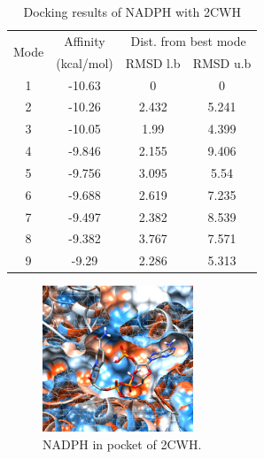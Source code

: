 \documentclass[12pt]{article}
\begin{document}
		
	\begin{table}[h!]
		\centering
		\caption{\centering Docking results of NADPH with 2CWH}
		\label{table10_1}
		\begin{tabular}{cccc}
			\toprule
			\multirow{2}{*}{Mode} & Affinity & \multicolumn{2}{c}{Dist. from best mode}\\
			&  (kcal/mol) & RMSD l.b & RMSD u.b\\
			\midrule
			1 & -10.63 & 0     & 0     \\
			2 & -10.26 & 2.432 & 5.241 \\
			3 & -10.05 & 1.99  & 4.399 \\
			4 & -9.846 & 2.155 & 9.406 \\
			5 & -9.756 & 3.095 & 5.54  \\
			6 & -9.688 & 2.619 & 7.235 \\
			7 & -9.497 & 2.382 & 8.539 \\
			8 & -9.382 & 3.767 & 7.571 \\
			9 & -9.29  & 2.286 & 5.313 \\
			\bottomrule
			
		\end{tabular}
	\end{table}
	
	\FloatBarrier
	\begin{figure}[h!]
		\centering
		\includegraphics[width=0.4\textwidth]{../10/Dock/chimera.png}
		\caption{\centering NADPH in pocket of 2CWH.}
		\label{fig10_2}
	\end{figure}
	\FloatBarrier
	
\end{document}
